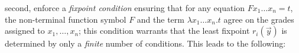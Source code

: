 \documentclass{easychair}
\begin{document}
second, enforce a \emph{fixpoint condition} ensuring that for any equation $Fx_1\dots x_n=t$, 
the non-terminal function symbol $F$ and the term $\lambda x_1\dots x_n.t$ agree on the grades assigned to $x_1,\dots, x_n$; this condition warrants that the least fixpoint $r_i(\vec y)$ is determined by only a \emph{finite} number of conditions. This leads to the following:
% 



%
%
%
%
\end{document}
